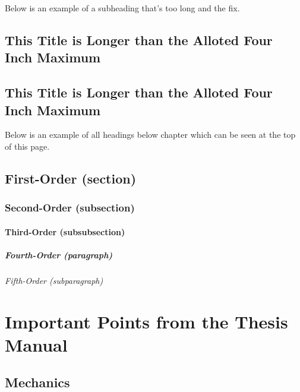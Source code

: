 \noindent Below is an example of a subheading that's too long and
the fix.


\section{This Title is Longer than the Alloted Four Inch Maximum}

\begin{center}\begin{minipage}[c]{4in}\begin{singlespace}\vspace{5.2mm}
\section{This Title is Longer than the Alloted Four Inch Maximum}
\end{singlespace}\end{minipage}\end{center}\vspace{1.1mm}

\noindent Below is an example of all headings below chapter which
can be seen at the top of this page.


\section{First-Order (section)}


\subsection{Second-Order (subsection)}


\subsubsection{Third-Order (subsubsection)}


\paragraph{Fourth-Order (paragraph)}


\subparagraph{Fifth-Order (subparagraph)}

\newpage{}

\chapter{Important Points from the Thesis Manual}


\section{Mechanics}

